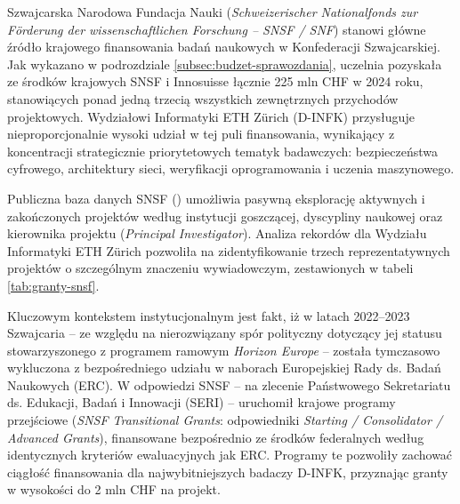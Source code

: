 Szwajcarska Narodowa Fundacja Nauki (\textit{Schweizerischer Nationalfonds zur Förderung der wissenschaftlichen Forschung -- SNSF / SNF}) stanowi główne źródło krajowego finansowania badań naukowych w Konfederacji Szwajcarskiej. Jak wykazano w podrozdziale \ref{subsec:budzet-sprawozdania}, uczelnia pozyskała ze środków krajowych SNSF i Innosuisse łącznie 225 mln CHF w 2024 roku, stanowiących ponad jedną trzecią wszystkich zewnętrznych przychodów projektowych. Wydziałowi Informatyki ETH Zürich (D-INFK) przysługuje nieproporcjonalnie wysoki udział w tej puli finansowania, wynikający z koncentracji strategicznie priorytetowych tematyk badawczych: bezpieczeństwa cyfrowego, architektury sieci, weryfikacji oprogramowania i uczenia maszynowego.

Publiczna baza danych SNSF () umożliwia pasywną eksplorację aktywnych i zakończonych projektów według instytucji goszczącej, dyscypliny naukowej oraz kierownika projektu (\textit{Principal Investigator}). Analiza rekordów dla Wydziału Informatyki ETH Zürich pozwoliła na zidentyfikowanie trzech reprezentatywnych projektów o szczególnym znaczeniu wywiadowczym, zestawionych w tabeli \ref{tab:granty-snsf}.


Kluczowym kontekstem instytucjonalnym jest fakt, iż w latach 2022--2023 Szwajcaria -- ze względu na nierozwiązany spór polityczny dotyczący jej statusu stowarzyszonego z programem ramowym \textit{Horizon Europe} -- została tymczasowo wykluczona z bezpośredniego udziału w naborach Europejskiej Rady ds. Badań Naukowych (ERC). W odpowiedzi SNSF -- na zlecenie Państwowego Sekretariatu ds. Edukacji, Badań i Innowacji (SERI) -- uruchomił krajowe programy przejściowe (\textit{SNSF Transitional Grants}: odpowiedniki \textit{Starting / Consolidator / Advanced Grants}), finansowane bezpośrednio ze środków federalnych według identycznych kryteriów ewaluacyjnych jak ERC. Programy te pozwoliły zachować ciągłość finansowania dla najwybitniejszych badaczy D-INFK, przyznając granty w wysokości do 2 mln CHF na projekt.

